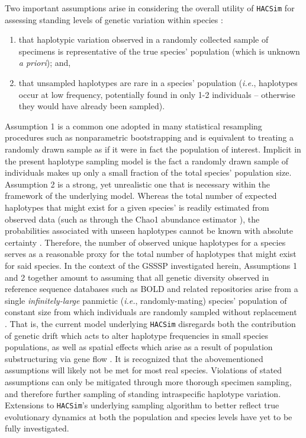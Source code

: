 Two important assumptions arise in considering the overall utility of {\tt HACSim} for assessing standing levels of genetic variation within species \cite{phillips2020hacsim}: 

\begin{enumerate}
\item that haplotypic variation observed in a randomly collected sample of specimens is representative of the true species' population (which is unknown \textit{a priori}); and,

\item that unsampled haplotypes are rare in a species' population (\textit{i.e.}, haplotypes occur at low frequency, potentially found in only 1-2 individuals -- otherwise they would have already been sampled).
\end{enumerate}

\noindent Assumption 1 is a common one adopted in many statistical resampling procedures such as nonparametric bootstrapping and is equivalent to treating a randomly drawn sample as if it were in fact the population of interest. Implicit in the present haplotype sampling model is the fact a randomly drawn sample of individuals makes up only a small fraction of the total species' population size. Assumption 2 is a strong, yet unrealistic one that is necessary within the framework of the underlying model. Whereas the total number of expected haplotypes that might exist for a given species' is readily estimated from observed data (such as through the Chao1 abundance estimator \cite{chao1984nonparametric}), the probabilities associated with unseen haplotypes cannot be known with absolute certainty \cite{phillips2020hacsim}. Therefore, the number of observed unique haplotypes for a species serves as a reasonable proxy for the total number of haplotypes that might exist for said species. In the context of the GSSSP investigated herein, Assumptions 1 and 2 together amount to assuming that all genetic diversity observed in reference sequence databases such as BOLD and related repositories arise from a single \textit{infinitely-large} panmictic (\textit{i.e.}, randomly-mating) species' population of constant size from which individuals are randomly sampled without replacement \\ \cite{phillips2015exploration}. That is, the current model underlying {\tt HACSim} disregards both the contribution of genetic drift which acts to alter haplotype frequencies in small species populations, as well as spatial effects which arise as a result of population substructuring via gene flow \cite{phillips2019incomplete}. It is recognized that the abovementioned assumptions will likely not be met for most real species. Violations of stated assumptions can only be mitigated through more thorough specimen sampling, and therefore further sampling of standing intraspecific haplotype variation. Extensions to {\tt HACSim}'s underlying sampling algorithm to better reflect true evolutionary dynamics at both the population and species levels have yet to be fully investigated.

